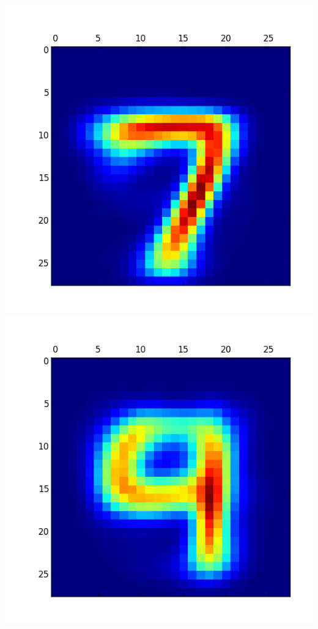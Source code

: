 \documentclass[11pt]{article}
\begin{document}
\begin{itemize}
\includegraphics[scale = 0.5]{26.png}
\includegraphics[scale = 0.5]{27.png}


\end{itemize}
\end{document}
